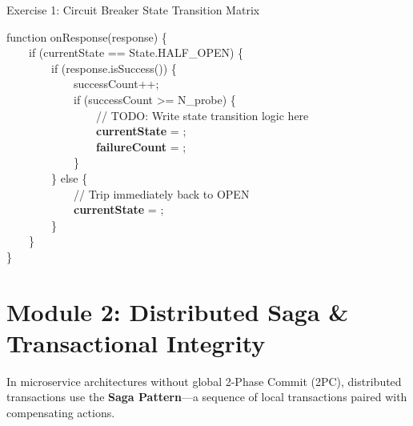 \documentclass[11pt, a4paper, parskip=half]{scrartcl}
\begin{document}
\begin{exercisebox}[label=ex:circuit]{Exercise 1: Circuit Breaker State Transition Matrix}
\vspace{2pt}
\begin{tcolorbox}[colback=cardBg, colframe=borderSlate, boxrule=0.5pt, fontupper=\small\ttfamily]
function onResponse(response) \{\\
\ \ \ \ if (currentState == State.HALF\_OPEN) \{\\
\ \ \ \ \ \ \ \ if (response.isSuccess()) \{\\
\ \ \ \ \ \ \ \ \ \ \ \ successCount++;\\
\ \ \ \ \ \ \ \ \ \ \ \ if (successCount >= N\_probe) \{\\
\ \ \ \ \ \ \ \ \ \ \ \ \ \ \ \ \textcolor{accentTeal}{// TODO: Write state transition logic here}\\
\ \ \ \ \ \ \ \ \ \ \ \ \ \ \ \ \textbf{currentState} = \underline{\hspace{4cm}};\\
\ \ \ \ \ \ \ \ \ \ \ \ \ \ \ \ \textbf{failureCount} = \underline{\hspace{4cm}};\\
\ \ \ \ \ \ \ \ \ \ \ \ \}\\
\ \ \ \ \ \ \ \ \} else \{\\
\ \ \ \ \ \ \ \ \ \ \ \ \textcolor{amberWarm}{// Trip immediately back to OPEN}\\
\ \ \ \ \ \ \ \ \ \ \ \ \textbf{currentState} = \underline{\hspace{4cm}};\\
\ \ \ \ \ \ \ \ \}\\
\ \ \ \ \}\\
\}
\end{tcolorbox}
\end{exercisebox}

\vspace{2pt}

\section{Module 2: Distributed Saga \& Transactional Integrity}

In microservice architectures without global 2-Phase Commit (2PC), distributed transactions use the \textbf{Saga Pattern}—a sequence of local transactions paired with compensating actions.
\end{document}
